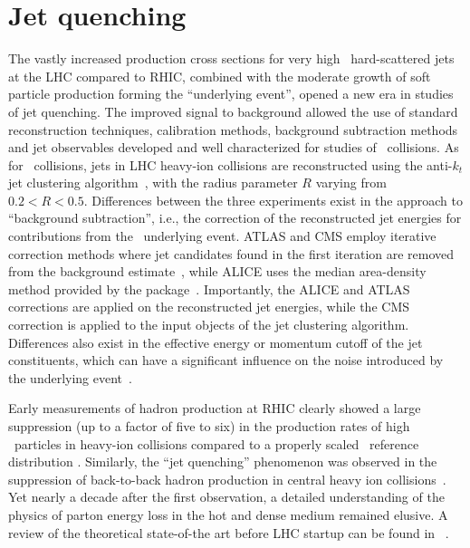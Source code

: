 \section{Jet quenching}
\label{jets_intro}

The vastly increased production cross sections for very high \pT\ hard-scattered jets at the LHC
compared to RHIC, combined with the moderate growth of soft particle production forming the ``underlying
event'', opened a new era in studies of jet quenching. The improved signal to background allowed the
use of standard reconstruction techniques, calibration methods, background subtraction methods and
jet observables developed and well characterized for studies of \pp\ collisions.
As for \pp\ collisions, jets in LHC heavy-ion collisions are reconstructed using
the {} anti-$k_t$ jet clustering algorithm~\cite{Cacciari:2008gp}, with the
radius parameter $R$ varying from $0.2 < R  < 0.5$. Differences between the three
experiments exist in the approach to ``background subtraction'', i.e., the correction
of the reconstructed jet energies for contributions from the \PbPb\ underlying event. 
ATLAS and CMS employ iterative correction methods where jet candidates found in
the first iteration are removed from the background estimate~\cite{Kodolova:2007hd,Grau:2008ed},
while ALICE uses the median area-density method provided by the {} package~\cite{Cacciari:2011ma}.
Importantly, the ALICE and ATLAS corrections are applied on the reconstructed jet energies,
while the CMS correction is applied to the input objects of the jet clustering algorithm.
Differences also exist in the effective energy or momentum cutoff of the jet constituents,
which can have a significant influence on the noise introduced by the underlying event~\cite{Abelev:2012ej}.

Early measurements of hadron production at RHIC
clearly showed a large suppression (up to a factor of five to six) in the production rates of
high \pT\ particles in heavy-ion collisions compared to a properly scaled \pp\ reference distribution
\cite{Adcox:2001jp,Adler:2002xw}. Similarly, the ``jet quenching'' phenomenon was observed
in the suppression of back-to-back hadron production
in central heavy ion collisions~\cite{Adcox:2001jp,Adler:2002xw}. Yet nearly a decade after the first observation, a detailed
understanding of the physics of parton energy loss in the hot and dense medium remained
elusive. A review of the theoretical state-of-the art before LHC startup can be
found in ~\cite{Wiedemann:2009sh}.

